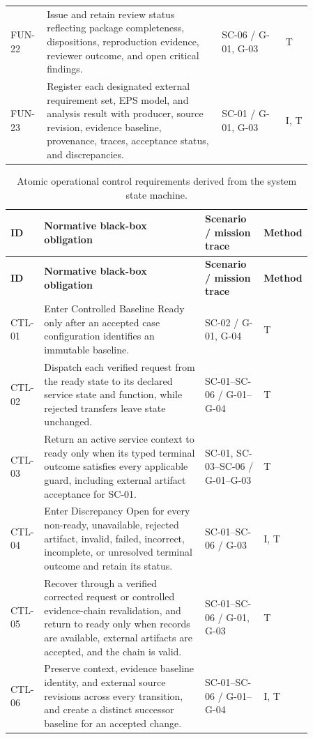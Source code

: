 \documentclass[11pt,a4paper]{article}
\begin{document}
\begin{longtable}{>{\raggedright\arraybackslash}p{0.07\linewidth} >{\raggedright\arraybackslash}p{0.52\linewidth} >{\raggedright\arraybackslash}p{0.19\linewidth} >{\raggedright\arraybackslash}p{0.08\linewidth}}
    FUN-22 & Issue and retain review status reflecting package completeness, dispositions, reproduction evidence, reviewer outcome, and open critical findings. & SC-06 / G-01, G-03 & T \\
    FUN-23 & Register each designated external requirement set, EPS model, and analysis result with producer, source revision, evidence baseline, provenance, traces, acceptance status, and discrepancies. & SC-01 / G-01, G-03 & I, T \\
    \bottomrule
\end{longtable}

\begin{longtable}{>{\raggedright\arraybackslash}p{0.07\linewidth} >{\raggedright\arraybackslash}p{0.52\linewidth} >{\raggedright\arraybackslash}p{0.19\linewidth} >{\raggedright\arraybackslash}p{0.08\linewidth}}
    \caption{Atomic operational control requirements derived from the system state machine.}\label{tab:framework-control-requirements}\\
    \toprule
    \textbf{ID} & \textbf{Normative black-box obligation} & \textbf{Scenario / mission trace} & \textbf{Method} \\
    \midrule
    \endfirsthead
    \toprule
    \textbf{ID} & \textbf{Normative black-box obligation} & \textbf{Scenario / mission trace} & \textbf{Method} \\
    \midrule
    \endhead
    CTL-01 & Enter Controlled Baseline Ready only after an accepted case configuration identifies an immutable baseline. & SC-02 / G-01, G-04 & T \\
    CTL-02 & Dispatch each verified request from the ready state to its declared service state and function, while rejected transfers leave state unchanged. & SC-01--SC-06 / G-01--G-04 & T \\
    CTL-03 & Return an active service context to ready only when its typed terminal outcome satisfies every applicable guard, including external artifact acceptance for SC-01. & SC-01, SC-03--SC-06 / G-01--G-03 & T \\
    CTL-04 & Enter Discrepancy Open for every non-ready, unavailable, rejected artifact, invalid, failed, incorrect, incomplete, or unresolved terminal outcome and retain its status. & SC-01--SC-06 / G-03 & I, T \\
    CTL-05 & Recover through a verified corrected request or controlled evidence-chain revalidation, and return to ready only when records are available, external artifacts are accepted, and the chain is valid. & SC-01--SC-06 / G-01, G-03 & T \\
    CTL-06 & Preserve context, evidence baseline identity, and external source revisions across every transition, and create a distinct successor baseline for an accepted change. & SC-01--SC-06 / G-01--G-04 & I, T \\
    \bottomrule
\end{longtable}
\end{document}
